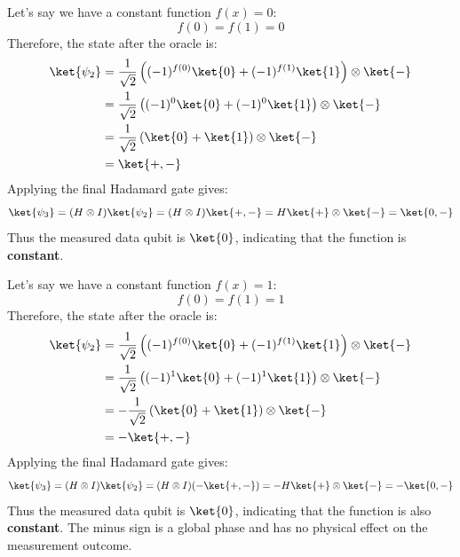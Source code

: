 \newpage

\begin{examplebox}[: $f(x) = 0$]
    Let's say we have a constant function $f(x) = 0$:
    \begin{equation*}
        f(0) = f(1) = 0
    \end{equation*}
    Therefore, the state after the oracle is:
    \begin{align*}
        \ket{\psi_2} &= \frac{1}{\sqrt{2}} \left( (-1)^{f(0)}\ket{0} + (-1)^{f(1)}\ket{1} \right) \otimes \ket{-} \\
        &= \frac{1}{\sqrt{2}} \left( (-1)^{0}\ket{0} + (-1)^{0}\ket{1} \right) \otimes \ket{-} \\
        &= \frac{1}{\sqrt{2}} \left( \ket{0} + \ket{1} \right) \otimes \ket{-} \\
        &= \ket{+,-}
    \end{align*}
    Applying the final Hadamard gate gives:
    \begin{equation*}
        \ket{\psi_3} = (H \otimes I)\ket{\psi_2} = (H \otimes I)\ket{+,-} = H\ket{+} \otimes \ket{-} = \ket{0,-}
    \end{equation*}
    Thus the measured data qubit is $\ket{0}$, indicating that the function is \textbf{constant}.
\end{examplebox}

\highspace
\begin{examplebox}[: $f(x) = 1$]
    Let's say we have a constant function $f(x) = 1$:
    \begin{equation*}
        f(0) = f(1) = 1
    \end{equation*}
    Therefore, the state after the oracle is:
    \begin{align*}
        \ket{\psi_2} &= \frac{1}{\sqrt{2}} \left( (-1)^{f(0)}\ket{0} + (-1)^{f(1)}\ket{1} \right) \otimes \ket{-} \\
        &= \frac{1}{\sqrt{2}} \left( (-1)^{1}\ket{0} + (-1)^{1}\ket{1} \right) \otimes \ket{-} \\
        &= -\frac{1}{\sqrt{2}} \left( \ket{0} + \ket{1} \right) \otimes \ket{-} \\
        &= -\ket{+,-}
    \end{align*}
    Applying the final Hadamard gate gives:
    \begin{equation*}
        \ket{\psi_3} = (H \otimes I)\ket{\psi_2} = (H \otimes I)(-\ket{+,-}) = -H\ket{+} \otimes \ket{-} = -\ket{0,-}
    \end{equation*}
    Thus the measured data qubit is $\ket{0}$, indicating that the function is also \textbf{constant}. The minus sign is a global phase and has no physical effect on the measurement outcome.
\end{examplebox}

